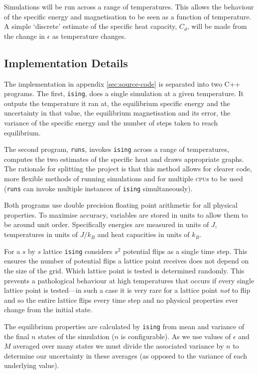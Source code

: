 \documentclass[12pt,a4paper,english]{article}
\begin{document}
Simulations will be run across a range of temperatures.  This allows the behaviour of the specific energy and magnetisation to be seen as a function of temperature.  A simple `discrete' estimate of the specific heat capacity, $C_d$, will be made from the change in $\epsilon$ as temperature changes.

\subsection{Implementation Details}
\label{sec:implementation-details}

The implementation in appendix \vref{sec:source-code} is separated into two C++ programs.  The first, \texttt{ising}, does a single simulation at a given temperature. It outputs the temperature it ran at, the equilibrium specific energy and the uncertainty in that value, the equilibrium magnetisation and its error, the variance of the specific energy and the number of steps taken to reach equilibrium.

The second program, \texttt{runs}, invokes \texttt{ising} across a range of temperatures, computes the two estimates of the specific heat and draws appropriate graphs.  The rationale for splitting the project is that this method allows for clearer code, more flexible methods of running simulations and for multiple \textsc{cpu}s to be used (\texttt{runs} can invoke multiple instances of \texttt{ising} simultaneously).

Both programs use double precision floating point arithmetic for all physical properties. To maximise accuracy, variables are stored in units to allow them to be around unit order.  Specifically energies are measured in units of $J$, temperatures in units of $J/k_B$ and heat capacities in units of $k_B$.

For a $s$ by $s$ lattice \texttt{ising} considers $s^2$ potential flips as a single time step.  This ensures the number of potential flips a lattice point receives does not depend on the size of the grid. Which lattice point is tested is determined randomly. This prevents a pathological behaviour at high temperatures that occurs if every single lattice point is tested---in such a case it is very rare for a lattice point \emph{not} to flip and so the entire lattice flips every time step and no physical properties ever change from the initial state.

The equilibrium properties are calculated by \texttt{ising} from mean and variance of the final $n$ states of the simulation ($n$ is configurable). As we use values of $\epsilon$ and $M$ averaged over many states we must divide the associated variance by $n$ to determine our uncertainty in these averages (as opposed to the variance of each underlying value).
\end{document}
